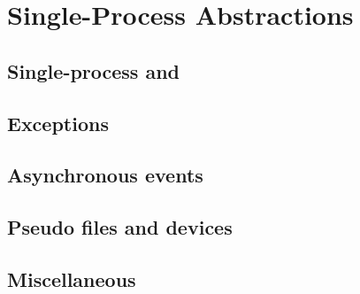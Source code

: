 \section{Single-Process Abstractions}


















\subsection{Single-process  and }




\subsection{Exceptions}





\subsection{Asynchronous events}




\subsection{Pseudo files and devices}




\subsection{Miscellaneous}
